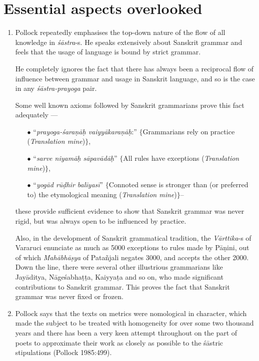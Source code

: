 \section*{Essential aspects overlooked}

\begin{enumerate}
\item Pollock repeatedly emphasises the top-down nature of the flow of all knowledge in {\it śāstra}-s. He speaks extensively about Sanskrit grammar and feels that the usage of language is bound by strict grammar. 

He completely ignores the fact that there has always been a reciprocal flow of influence between grammar and usage in Sanskrit language, and so is the case in any \textsl{śāstra-prayoga} pair. 

Some well known axioms followed by Sanskrit grammarians prove this fact adequately --- 
\begin{itemize}
\item[$\bullet$] ``\textsl{prayoga-śaraṇāḥ vaiyyākaraṇāḥ}:'' $\{$Grammarians rely on practice (\textsl{Translation mine})$\}$, 

\item[$\bullet$] ``\textsl{sarve niyamāḥ sāpavādāḥ}'' $\{$All rules have exceptions (\textsl{Translation mine})$\}$, 

\item[$\bullet$] ``\textsl{yogād rūḍhir balīyasī}'' $\{$Connoted sense is stronger than (or preferred to) the etymological meaning (\textsl{Translation mine})$\}$-- 
\end{itemize}

these provide sufficient evidence to show that Sanskrit grammar was never rigid, but was always open to be influenced by practice. 

Also, in the development of Sanskrit grammatical tradition, the  {\it Vārttika}-s of Vararuci enunciate as much as 5000 exceptions to rules made by Pāṇini, out of which {\it Mahābhāṣya} of Patañjali negates 3000, and accepts the other 2000. Down the line, there were several other illustrious grammarians like Jayāditya, Nāgeśabhaṭṭa, Kaiyyaṭa  and so on, who made significant contributions to Sanskrit grammar. This proves the fact that Sanskrit grammar  was never fixed or frozen.

\item Pollock says that the texts on metrics were nomological in character, which made the subject to be treated with homogeneity for over some two thousand years and there has been a very keen attempt throughout on the part of poets to approximate their work as closely as possible to the śāstric stipulations (Pollock 1985:499). 


\end{enumerate}
